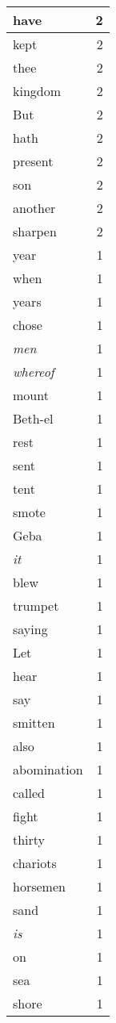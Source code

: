 \begin{center}
\begin{longtable}{l|r}
have & 2 \\ \hline
kept & 2 \\ \hline
thee & 2 \\ \hline
kingdom & 2 \\ \hline
But & 2 \\ \hline
hath & 2 \\ \hline
present & 2 \\ \hline
son & 2 \\ \hline
another & 2 \\ \hline
sharpen & 2 \\ \hline
year & 1 \\ \hline
when & 1 \\ \hline
years & 1 \\ \hline
chose & 1 \\ \hline
\emph{men} & 1 \\ \hline
\emph{whereof} & 1 \\ \hline
mount & 1 \\ \hline
Beth-el & 1 \\ \hline
rest & 1 \\ \hline
sent & 1 \\ \hline
tent & 1 \\ \hline
smote & 1 \\ \hline
Geba & 1 \\ \hline
\emph{it} & 1 \\ \hline
blew & 1 \\ \hline
trumpet & 1 \\ \hline
saying & 1 \\ \hline
Let & 1 \\ \hline
hear & 1 \\ \hline
say & 1 \\ \hline
smitten & 1 \\ \hline
also & 1 \\ \hline
abomination & 1 \\ \hline
called & 1 \\ \hline
fight & 1 \\ \hline
thirty & 1 \\ \hline
chariots & 1 \\ \hline
horsemen & 1 \\ \hline
sand & 1 \\ \hline
\emph{is} & 1 \\ \hline
on & 1 \\ \hline
sea & 1 \\ \hline
shore & 1 \\ \hline

\end{longtable}
\end{center}
